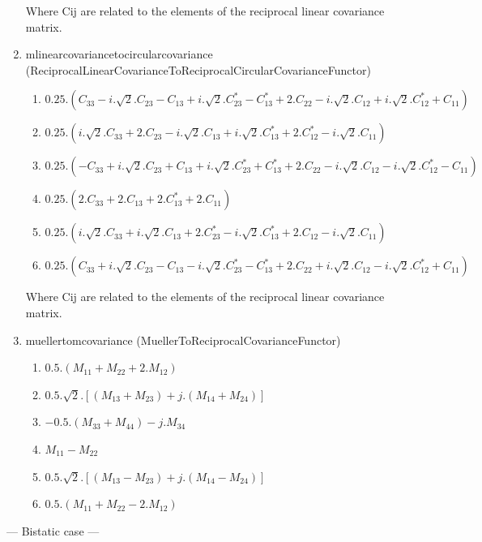 \begin{enumerate}
Where Cij are related to the elements of the reciprocal linear covariance matrix.
 
\item mlinearcovariancetocircularcovariance (ReciprocalLinearCovarianceToReciprocalCircularCovarianceFunctor)
\begin{enumerate}
\item $ 0.25 . ( C_{33}-i.\sqrt{2}.C_{23}-C_{13}+i.\sqrt{2}.C_{23}^{*}-C_{13}^{*}+2.C_{22}-i.\sqrt{2}.C_{12}+i.\sqrt{2}.C_{12}^{*}+C_{11} ) $ 
\item $ 0.25 . ( i.\sqrt{2}.C_{33}+2.C_{23}-i.\sqrt{2}.C_{13}+i.\sqrt{2}.C_{13}^{*}+2.C_{12}^{*}-i.\sqrt{2}.C_{11} ) $ 
\item $ 0.25 . ( -C_{33}+i.\sqrt{2}.C_{23}+C_{13}+i.\sqrt{2}.C_{23}^{*}+C_{13}^{*}+2.C_{22}-i.\sqrt{2}.C_{12}-i.\sqrt{2}.C_{12}^{*}-C_{11} ) $ 
\item $ 0.25 . ( 2.C_{33}+2.C_{13}+2.C_{13}^{*}+2.C_{11} ) $ 
\item $ 0.25 . ( i.\sqrt{2}.C_{33}+i.\sqrt{2}.C_{13}+2.C_{23}^{*}-i.\sqrt{2}.C_{13}^{*}+2.C_{12}-i.\sqrt{2}.C_{11} ) $ 
\item $ 0.25 . ( C_{33}+i.\sqrt{2}.C_{23}-C_{13}-i.\sqrt{2}.C_{23}^{*}-C_{13}^{*}+2.C_{22}+i.\sqrt{2}.C_{12}-i.\sqrt{2}.C_{12}^{*}+C_{11} ) $
\end{enumerate}

Where Cij are related to the elements of the reciprocal linear covariance matrix.

\item muellertomcovariance (MuellerToReciprocalCovarianceFunctor)
\begin{enumerate}
\item $ 0.5.(M_{11}+M_{22}+2.M_{12}) $ 
\item $ 0.5.\sqrt{2}.[(M_{13}+M_{23}) + j.(M_{14}+M_{24})] $ 
\item $ -0.5.(M_{33}+M_{44}) - j.M_{34} $ 
\item $ M_{11}-M_{22} $ 
\item $ 0.5.\sqrt{2}.[(M_{13}-M_{23}) + j.(M_{14}-M_{24})] $ 
\item $ 0.5.(M_{11}+M_{22}-2.M_{12}) $
\end{enumerate}

\end{enumerate}

--- Bistatic case ---

